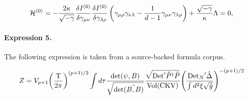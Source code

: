 \documentclass[11pt]{article}
\begin{document}
\begin{align*}{\cal H}^{(0)} = -\frac{2 \kappa}{\sqrt{-\gamma}}\frac{\delta I^{(0)}}{\delta \gamma_{\mu \nu}}\frac{\delta I^{(0)}}{\delta \gamma_{\lambda \rho}}\left( \gamma_{\mu \rho} \gamma_{\nu \lambda}-\frac{1}{d-1} \gamma_{\mu \nu } \gamma_{\lambda \rho} \right)+ \frac{\sqrt{-\gamma}}{\kappa} \Lambda=0,\end{align*}

\paragraph{Expression 5.} The following expression is taken from a source-backed formula corpus.

\begin{align*}Z={V_{p+1}}{{\left({{\text{T}}\over{2\pi}}\right)}^{(p+1)/2}}\int d\tau{{\text{det}(\psi,B)}\over{\sqrt{\text{det}\hat{(B,B)}}}}{{\sqrt{\text{Det}'{\hat{P}^\dagger}\hat{P}}}\over{\text{Vol}(\text{CKV})}}{{\left({{{\text{Det}_N}'\hat{\Delta}}\over{\int{d^2}\xi\sqrt{\hat{g}}}}\right)}^{-(p+1)/2}}\end{align*}
\end{document}
